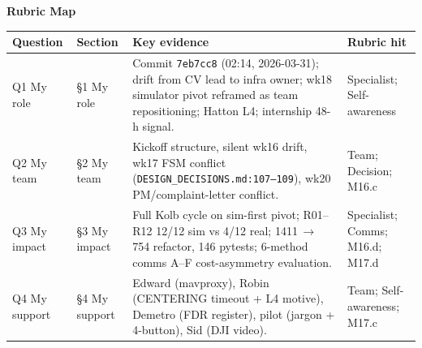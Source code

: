 \documentclass[11pt,a4paper]{article}
\begin{document}


\begin{center}
{\large\bfseries Rubric Map}
\end{center}
\vspace{-0.4em}
\begin{tabularx}{\textwidth}{@{}l l >{\raggedright\arraybackslash}X l@{}}
\toprule
\textbf{Question} & \textbf{Section} & \textbf{Key evidence} & \textbf{Rubric hit} \\
\midrule
Q1 My role       & \S1 My role    & Commit \texttt{7eb7cc8} (02:14, 2026-03-31); drift from CV lead to infra owner; wk18 simulator pivot reframed as team repositioning; Hatton L4; internship 48-h signal. & Specialist; Self-awareness \\
Q2 My team       & \S2 My team    & Kickoff structure, silent wk16 drift, wk17 FSM conflict (\texttt{DESIGN\_DECISIONS.md:107--109}), wk20 PM/complaint-letter conflict. & Team; Decision; M16.c \\
Q3 My impact     & \S3 My impact  & Full Kolb cycle on sim-first pivot; R01--R12 12/12 sim vs 4/12 real; 1411\,$\to$\,754 refactor, 146 pytests; 6-method comms A--F cost-asymmetry evaluation. & Specialist; Comms; M16.d; M17.d \\
Q4 My support    & \S4 My support & Edward (mavproxy), Robin (CENTERING timeout + L4 motive), Demetro (FDR register), pilot (jargon + 4-button), Sid (DJI video). & Team; Self-awareness; M17.c \\
\bottomrule
\end{tabularx}

\vspace{0.6em}





\end{document}
